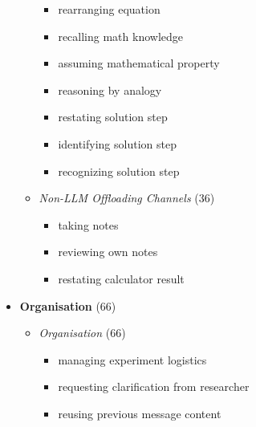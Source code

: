 \begin{multicols}{2}
\begin{itemize}[leftmargin=*, itemsep=2pt, topsep=0pt]
\begin{itemize}[leftmargin=*, nosep]
\begin{itemize}[leftmargin=*, nosep]
                \item rearranging equation
                \item recalling math knowledge
                \item assuming mathematical property
                \item reasoning by analogy
                \item restating solution step
                \item identifying solution step
                \item recognizing solution step
            \end{itemize}
            \item \textit{Non-\ac{LLM} Offloading Channels} (36)
            \begin{itemize}[leftmargin=*, nosep]
                \item taking notes
                \item reviewing own notes
                \item restating calculator result
            \end{itemize}
        \end{itemize}

        \item \textbf{Organisation} (66)
        \begin{itemize}[leftmargin=*, nosep]
            \item \textit{Organisation} (66)
            \begin{itemize}[leftmargin=*, nosep]
                \item managing experiment logistics
                \item requesting clarification from researcher
                \item reusing previous message content
            \end{itemize}
        \end{itemize}


\end{itemize}
\end{multicols}
